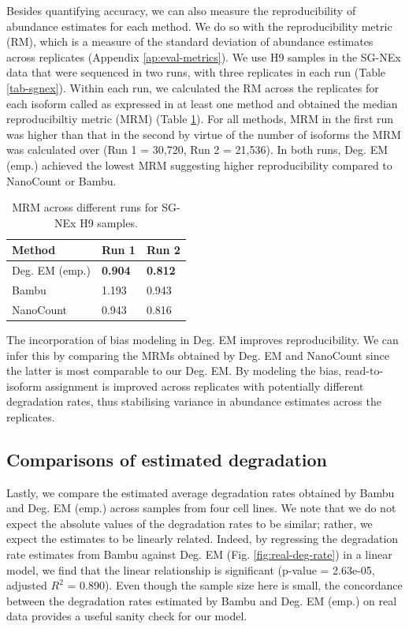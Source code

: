 Besides quantifying accuracy, we can also measure the reproducibility of abundance estimates for each method. We do so with the reproducibility metric (RM), which is a measure of the standard deviation of abundance estimates across replicates (Appendix \ref{ap:eval-metrics}). We use H9 samples in the SG-NEx data that were sequenced in two runs, with three replicates in each run (Table \ref{tab-sgnex}). Within each run, we calculated the RM across the replicates for each isoform called as expressed in at least one method and obtained the median reproducibiltiy metric (MRM) (Table \ref{tab-mrm}). For all methods, MRM in the first run was higher than that in the second by virtue of the number of isoforms the MRM was calculated over (Run 1 = 30,720, Run 2 = 21,536). In both runs, Deg. EM (emp.) achieved the lowest MRM suggesting higher reproducibility compared to NanoCount or Bambu. 

\begin{table}[htbp]
\centering
\begin{tabular}{|p{3cm}|p{2cm}|p{2cm}|}
\hline
Method & Run 1 & Run 2 \bigstrut\\
\hline
Deg. EM (emp.) & \textbf{0.904} & \textbf{0.812} \bigstrut\\
\hline
Bambu & 1.193 & 0.943 \bigstrut\\
\hline
NanoCount & 0.943 & 0.816 \bigstrut\\
\hline
\end{tabular}%
\caption[MRM across different runs for SG-NEx data]{MRM across different runs for SG-NEx H9 samples.}
\label{tab-mrm}%
\end{table}%

The incorporation of bias modeling in Deg. EM improves reproducibility. We can infer this by comparing the MRMs obtained by Deg. EM and NanoCount since the latter is most comparable to our Deg. EM. By modeling the bias, read-to-isoform assignment is improved across replicates with potentially different degradation rates, thus stabilising variance in abundance estimates across the replicates.       

\subsection{Comparisons of estimated degradation}

Lastly, we compare the estimated average degradation rates obtained by Bambu and Deg. EM (emp.) across samples from four cell lines. We note that we do not expect the absolute values of the degradation rates to be similar; rather, we expect the estimates to be linearly related. Indeed, by regressing the degradation rate estimates from Bambu against Deg. EM (Fig. \ref{fig:real-deg-rate}) in a linear model, we find that the linear relationship is significant (p-value = 2.63e-05, adjusted $R^2$ = 0.890). Even though the sample size here is small, the concordance between the degradation rates estimated by Bambu and Deg. EM (emp.) on real data provides a useful sanity check for our model.

